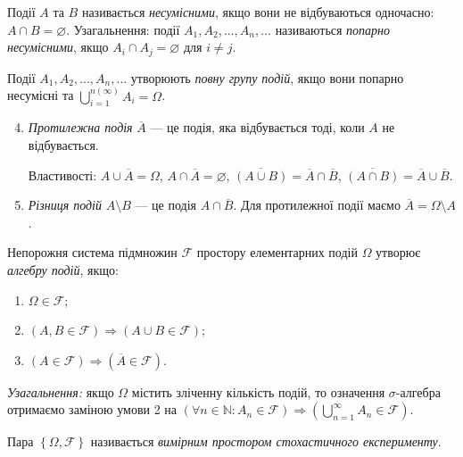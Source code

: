 \begin{definition}
    Події $A$ та $B$ називається \emph{несумісними}, якщо вони не відбуваються одночасно: $A \cap B = \varnothing$.
    Узагальнення: події $A_1, A_2, ..., A_n, ...$ називаються \emph{попарно несумісними}, якщо $A_i \cap A_j = \varnothing$ для $i \neq j$.
\end{definition}
\begin{definition}
    Події $A_1, A_2, ..., A_n, ...$ утворюють \emph{повну групу подій}, якщо вони попарно несумісні 
    та $\bigcup\limits_{i=1}^{n \left( \infty \right)} A_i = \Omega$.
\end{definition}
\begin{enumerate}
    \setcounter{enumi}{3}
    \item \emph{Протилежна подія} $\overline{A}$ --- це подія, яка відбувається тоді, коли $A$ не відбувається.
    
    Властивості: $A \cup \overline{A} = \Omega$, $A \cap \overline{A} = \varnothing$, $\overline{\left( A \cup B \right)} = \overline{A} \cap \overline{B}$,
    $\overline{\left( A \cap B \right)} = \overline{A} \cup \overline{B}$.
    \item \emph{Різниця подій} $A \setminus B$ --- це подія $A \cap \overline{B}$. Для протилежної події маємо $\overline{A} =  \Omega \setminus A$.
\end{enumerate}

\begin{definition}
    Непорожня система підмножин $\mathcal{F}$ простору елементарних подій $\Omega$ утворює \emph{алгебру подій}, якщо:
    \begin{enumerate}
        \item $\Omega \in \mathcal{F}$;
        \item $\left( A, B \in \mathcal{F}\right) \Rightarrow \left( A \cup B \in \mathcal{F}\right)$;
        \item $\left( A \in \mathcal{F}\right) \Rightarrow \left( \overline{A} \in \mathcal{F}\right)$.
    \end{enumerate}
    \emph{Узагальнення:} якщо $\Omega$ містить зліченну кількість подій, то означення $\sigma$-алгебра отримаємо заміною умови
    2 на $\left(\forall n \in \mathbb{N}: A_n \in \mathcal{F} \right) \Rightarrow \left( \bigcup\limits_{n=1}^{\infty} A_n \in \mathcal{F}\right)$.
    
    Пара $\left\{\Omega, \mathcal{F}\right\}$ називається \emph{вимірним простором стохастичного експерименту}.
\end{definition}

